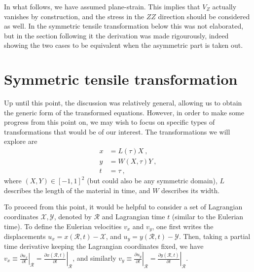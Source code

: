 \documentclass[12pt,a4paper]{article}
\begin{document}
In what follows, we have assumed plane-strain. This implies that $V_Z$ actually vanishes by construction, and the stress in the $ZZ$ direction should be considered as well. In the symmetric tensile transformation below this was not elaborated, but in the section following it the derivation was made rigourously, indeed showing the two cases to be equivalent when the asymmetric part is taken out.
\section{Symmetric tensile transformation} \label{se:sym_tensile}
Up until this point, the discussion was relatively general, allowing us to obtain the generic form of the transformed equations. However, in order to make some progress from this point on, we may wish to focus on specific types of transformations that would be of our interest. The transformations we will explore are
\begin{equation}\label{eq:transformations_sym_tensile}
  \begin{split}
     x &= L\left(\tau\right) X \ , \\
     y &= W\left(X,\tau\right) Y \ , \\
     t &= \tau \ ,
  \end{split}
\end{equation}
where $\left(X,Y\right)\in\left[-1,1\right]^2$ (but could also be any symmetric domain), $L$ describes the length of the material in time, and $W$ describes its width.

To proceed from this point, it would be helpful to consider a set of Lagrangian coordinates $\mathcal{X},\mathcal{Y}$, denoted by $\mathcal{R}$ and Lagrangian time $t$ (similar to the Eulerian time). To define the Eulerian velocities $v_x$ and $v_y$, one first writes the displacements $u_x = x\left(\mathcal{R},t\right) - \mathcal{X}$, and $u_y = y\left(\mathcal{R},t\right) - \mathcal{Y}$. Then, taking a partial time derivative keeping the Lagrangian coordinates fixed, we have $v_x\equiv\left.\frac{\partial u_x}{\partial t}\right|_{\mathcal{R}} = \left.\frac{\partial x\left(\mathcal{R},t\right)}{\partial t}\right|_{\mathcal{R}}$, and similarly $v_y\equiv\left.\frac{\partial u_y}{\partial t}\right|_{\mathcal{R}} = \left.\frac{\partial y\left(\mathcal{R},t\right)}{\partial t}\right|_{\mathcal{R}}$.
\end{document}
